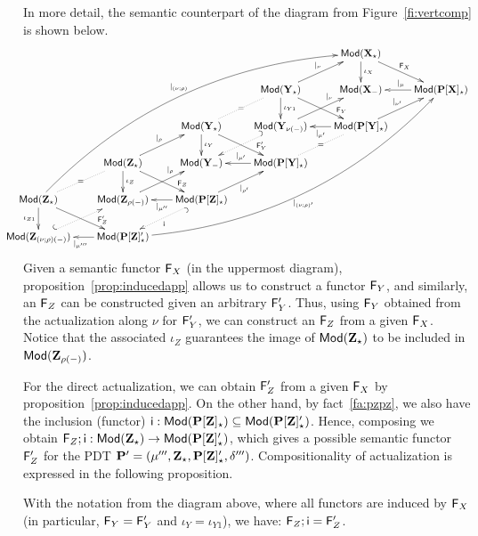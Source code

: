 In more detail, the semantic counterpart of the diagram from Figure~\ref{fi:vertcomp} is
shown below.
\[
\hspace*{-2em}\xymatrix@C=0.7cm@R=0.7cm{
&&&& \Mod(\thr X_\cons) \ar[dr]^{\fu F_X} \ar[d]^{\iota_X} & \\
&&& \Mod(\thr Y_\cons)  \ar[dr]^>>>{\fu F_Y} \ar[d]^{\iota_{Y1}}
\ar[ur]^{|_{\nu}} \ar@{.}[dl]|{=} 
     & \Mod(\thr X_\weak) & \Mod(\thr{P[X]_\cons}) \ar[l]_{|_{\mu}} \\
&& \Mod(\thr Y_\cons) \ar[dr]^>>>{\fu F'_Y} \ar[d]^{\iota_Y} 
     & \Mod(\thr Y_{\nu(\weak)}) \ar[ur]^>>>>>{|_{\nu}} \ar@{_{(}.>}[dl]
     & \Mod(\thr{P[Y]_\cons}) \ar[l]^{|_{\mu'}} \ar[ur]^{|_{\nu'}}
     \ar@{.}[dl]|{=} \\
& \Mod(\thr Z_\cons) \ar[ur]^{|_\rho} \ar[d]^{\iota_Z} \ar[dr]^>>>{\fu F_Z} & \Mod(\thr Y_\weak) &
       \Mod(\thr{P[Y]_\cons}) \ar[l]_{|_{\mu'}} \\
\Mod(\thr Z_\cons) \ar[d]_{\iota_{Z1}} \ar[dr]^>>>{\fu F'_Z} \ar@{.}[ur]|{=}\ar@/^3pc/[uuuurrrr]^{|_{(\nu;\rho)}}
     & \Mod(\thr Z_{\rho(\weak)}) \ar[ur]^>>>>>{|_{\rho}} &
       \Mod(\thr{P[Z]_\cons}) \ar[l]^{|_{\mu''}} \ar[ur]_{|_{\rho'}}
       \ar@{^{(}.>}[dl]^{\fu i} \\
\Mod(\thr Z_{(\nu;\rho)(\weak)}) \ar@{^{(}.>}[ur]
    & \Mod(\thr{P[Z]'_\cons}) \ar[l]^{|_{\mu'''}}   \ar@/_3pc/[uuuurrrr]_{|_{(\nu;\rho)'}}
}
\]
Given a semantic functor $\fu F_X$ (in the uppermost diagram),
proposition~\ref{prop:inducedapp} allows us to construct a functor $\fu F_Y$,
and similarly, an $\fu F_Z$ can be constructed given an arbitrary $\fu F'_Y$. Thus, using
$\fu F_Y$ obtained from the actualization along $\nu$ for $\fu F'_Y$, we can
construct an $\fu F_Z$ from a given $\fu F_X$. Notice that the associated
$\iota_Z$ guarantees the image of $\Mod(\thr Z_\cons)$ to be
included in $\Mod(\thr Z_{\rho(\weak)})$. 

For the direct actualization, we can obtain $\fu F'_Z$ from a given $\fu
F_X$ by proposition~\ref{prop:inducedapp}. On the other hand,
by fact~\ref{fa:pzpz}, we also have the inclusion (functor) 
$\fu i:\Mod(\thr{P[Z]_\cons})\subseteq\Mod(\thr{P[Z]'_\cons})$.  
Hence, composing we obtain $\comp{\fu
F_Z}{\fu i}:\Mod(\thr{Z_\cons})\to\Mod(\thr{P[Z]'_\cons})$, which gives a
possible semantic functor $\fu F'_Z$ for the PDT
$\thr P'=\pdtsp{\mu'''}{\delta'''}{\thr{Z_\cons}}{\thr{P[Z]'_\cons}}$. 
Compositionality of actualization is expressed in the following
proposition. 
%
\begin{proposition}
With the notation from the diagram above, where all functors are induced by
$\fu F_X$ (in particular, $\fu F_Y=\fu F'_Y$ and $\iota_Y=\iota_{Y1}$), we have:
$\fu F_Z;\fu i = \fu F'_Z$.
\end{proposition}
%

